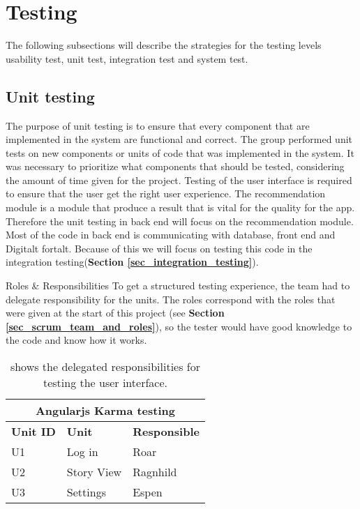
\chapter{Testing}
\label{chap_testing}

The following subsections will describe the strategies for the testing levels usability test, unit test, integration test and system test. 

\section{Unit testing}
\label{sec_unit_testing}

The purpose of unit testing is to ensure that every component that are implemented in the system are functional and correct. The group performed unit tests on new components or units of code that was implemented in the system. It was necessary to prioritize what components that should be tested, considering the amount of time given for the project. Testing of the user interface is required to ensure that the user get the right user experience. The recommendation module is a module that produce a result that is vital for the quality for the app. Therefore the unit testing in back end will focus on the recommendation module. Most of the code in back end is communicating with database, front end and Digitalt fortalt. Because of this we will focus on testing this code in the integration testing(\textbf{Section \ref{sec_integration_testing}}).\newline

Roles \& Responsibilities\newline
To get a structured testing experience, the team had to delegate responsibility for the units. The roles correspond with the roles that were given at the start of this project (see \textbf{Section \ref{sec_scrum_team_and_roles}}), so the tester would have good knowledge to the code and know how it works.  

\begin{table}[!h]
	\begin{center}
		\begin{tabular}{ | l | l | l |}
			\hline
			\multicolumn{3}{|c|}{\textbf{Angularjs Karma testing}} \\
			\hline
			\textbf{Unit ID} & \textbf{Unit} & \textbf{Responsible} \\ \hline
			U1 & Log in & Roar \\ \hline
			U2 & Story View & Ragnhild \\ \hline
			U3 & Settings & Espen \\ \hline
		\end{tabular}
	\end{center}
	\caption{shows the delegated responsibilities for testing the user interface.}
	\label{Tab_karmatesting}
\end{table}

